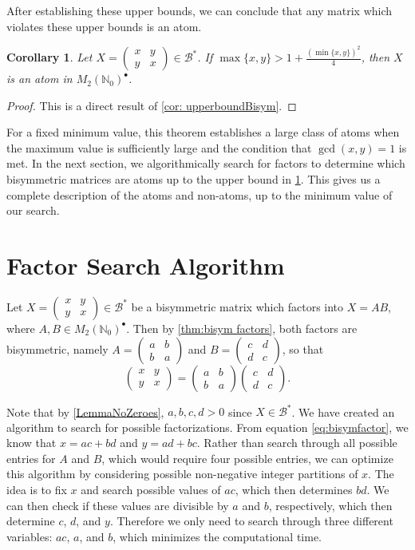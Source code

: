 \documentclass{amsart}
\newcommand{\pmx}[4]{\begin{pmatrix} #1 & #2 \\ #3 & #4 \end{pmatrix}}
\newcommand{\mtwo}{M_2(\mathbb{N}_0)^\bullet}
\newcommand{\Bstar}{\mathcal{B}^*}
\newtheorem{cor}[theorem]{Corollary}
\begin{document}
After establishing these upper bounds, we can conclude that any matrix which violates these upper bounds is an atom.

\begin{cor}\label{thm:boundBisym} Let $X=\pmx{x}{y}{y}{x} \in \Bstar$. If $\max\{x,y\}> 1+ \frac{(\min\{x,y\})^2}{4}$, then $X$ is an atom in $\mtwo$.
\end{cor}

\begin{proof}
This is a direct result of \cref{cor: upperboundBisym}.
\end{proof}

For a fixed minimum value, this theorem establishes a large class of atoms when the maximum value is sufficiently large and the condition that $\gcd(x,y)=1$ is met. In the next section, we algorithmically search for factors to determine which bisymmetric matrices are atoms up to the upper bound in  \cref{thm:boundBisym}. This gives us a complete description of the atoms and non-atoms, up to the minimum value of our search.



\section{Factor Search Algorithm}\label{sect: algorithm}

Let $X=\pmx{x}{y}{y}{x}\in \Bstar$ be a bisymmetric matrix which factors into $X=AB$, where $A, B \in \mtwo$. Then by \cref{thm:bisym factors}, both factors are bisymmetric, namely $A=\pmx{a}{b}{b}{a}$ and $B=\pmx{c}{d}{d}{c}$, so that
\begin{equation}\label{eq:bisymfactor}
\pmx{x}{y}{y}{x}= \pmx{a}{b}{b}{a}\pmx{c}{d}{d}{c}.
\end{equation}


Note that by \cref{LemmaNoZeroes}, $a,b,c,d>0$ since $X \in \Bstar$. We have created an algorithm to search for possible factorizations. From equation \eqref{eq:bisymfactor}, we know that $x=ac+bd$ and $y=ad+bc$. Rather than search through all possible entries for $A$ and $B$, which would require four possible entries, we can optimize this algorithm by considering possible non-negative integer partitions of $x$. The idea is  to fix $x$ and search possible values of $ac$, which then determines $bd$. We can then check if these values are divisible by $a$ and $b$, respectively, which then determine $c$, $d$, and $y$. Therefore we only need to search through three different variables: $ac$, $a$, and $b$, which minimizes the computational time.
\end{document}
